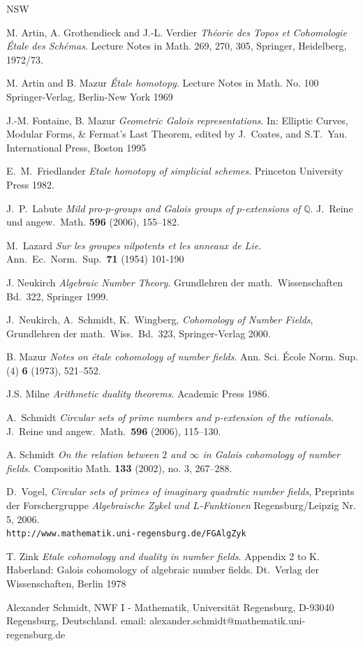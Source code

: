 \documentclass[10pt]{article}
\newcommand{\Q}{{\mathbb Q}}
\theoremstyle{alex}
\theoremstyle{alexdef}
\begin{document}
\begin{thebibliography}{NSW}

 M. Artin, A. Grothendieck and J.-L. Verdier {\it
Th\'{e}orie des Topos et Cohomologie \'{E}tale des Sch\'{e}mas}. Lecture Notes in Math. 269, 270, 305,
Springer, Heidelberg, 1972/73.

 M. Artin and B. Mazur {\it \'{E}tale homotopy}. Lecture Notes in Math. No. 100 Springer-Verlag, Berlin-New York 1969

 J.-M. Fontaine, B. Mazur {\it Geometric Galois representations}. In: Elliptic Curves,
 Modular Forms, \& Fermat's Last Theorem, edited by J.\ Coates, and S.T.\ Yau. International Press, Boston 1995

 E.~M.~Friedlander {\it Etale homotopy of simplicial schemes}. Princeton University Press 1982.

 J.~P.~Labute {\it Mild pro-$p$-groups and Galois groups of $p$-extensions of\/ $\Q$}.  J.~Reine und angew.~Math. {\bf 596} (2006), 155--182.

 M.~Lazard {\it Sur les groupes nilpotents et les anneaux de Lie.}
Ann.\ Ec.\ Norm.\ Sup.\ {\bf 71} (1954) 101-190

 J. Neukirch {\it Algebraic Number Theory}. Grundlehren der math.\ Wissenschaften Bd.\ 322, Springer 1999.

J.~Neukirch, A.~Schmidt, K.~Wingberg, \textit{Cohomology of Number Fields},
Grund\-lehren der math.\ Wiss.\ Bd.\ 323, Springer-Verlag 2000.

 B. Mazur {\it Notes on \'{e}tale cohomology of number fields}.  Ann. Sci. \'{E}cole Norm. Sup. (4)  {\bf 6}  (1973), 521--552.

 J.S. Milne {\it Arithmetic duality theorems}. Academic Press 1986.

 A.~Schmidt \textit{Circular sets of prime numbers and $p$-extension of the rationals}. J.~Reine und angew.~Math.\ {\bf 596} (2006), 115--130.

 A. Schmidt {\it On the relation between $2$ and $\infty$ in Galois cohomology of number fields}. Compositio Math. {\bf 133}  (2002),  no. 3, 267--288.

D.~Vogel, \textit{Circular sets of primes of imaginary quadratic number fields},
Preprints der Forschergruppe {\it Algebraische Zykel und $L$-Funktionen} Regensburg/Leipzig Nr. 5, 2006.\\
{\tt http://www.mathematik.uni-regensburg.de/FGAlgZyk}

 T. Zink {\em Etale cohomology and duality in number fields}. Appendix 2
to K. Haberland: Galois cohomology of algebraic number fields. Dt.\ Verlag der
Wissenschaften, Berlin 1978
\end{thebibliography}

\vskip2cm



\noindent \footnotesize{Alexander Schmidt, NWF I - Mathematik, Universit\"{a}t Regensburg, D-93040
Regensburg, Deutschland. email: alexander.schmidt@mathematik.uni-regensburg.de}
\end{document}
